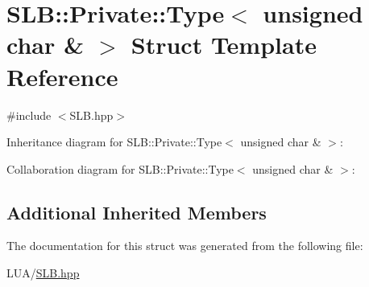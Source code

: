 \hypertarget{structSLB_1_1Private_1_1Type_3_01unsigned_01char_01_6_01_4}{}\section{S\+LB\+:\+:Private\+:\+:Type$<$ unsigned char \& $>$ Struct Template Reference}
\label{structSLB_1_1Private_1_1Type_3_01unsigned_01char_01_6_01_4}


{\ttfamily \#include $<$S\+L\+B.\+hpp$>$}



Inheritance diagram for S\+LB\+:\+:Private\+:\+:Type$<$ unsigned char \& $>$\+:


Collaboration diagram for S\+LB\+:\+:Private\+:\+:Type$<$ unsigned char \& $>$\+:
\subsection*{Additional Inherited Members}


The documentation for this struct was generated from the following file\+:\begin{DoxyCompactItemize}
\item 
L\+U\+A/\hyperlink{SLB_8hpp}{S\+L\+B.\+hpp}\end{DoxyCompactItemize}
